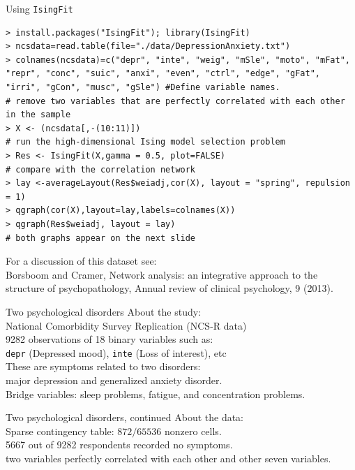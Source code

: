 \documentclass[dvipsnames,aspectratio=169]{beamer} %
\begin{document}
\begin{frame}[fragile,label=DepAnx]{Using \texttt{IsingFit}}
	\begin{lstlisting}
> install.packages("IsingFit"); library(IsingFit)
> ncsdata=read.table(file="./data/DepressionAnxiety.txt") 
> colnames(ncsdata)=c("depr", "inte", "weig", "mSle", "moto", "mFat", "repr", "conc", "suic", "anxi", "even", "ctrl", "edge", "gFat", "irri", "gCon", "musc", "gSle") #Define variable names.
# remove two variables that are perfectly correlated with each other in the sample
> X <- (ncsdata[,-(10:11)])
# run the high-dimensional Ising model selection problem
> Res <- IsingFit(X,gamma = 0.5, plot=FALSE)
# compare with the correlation network
> lay <-averageLayout(Res$weiadj,cor(X), layout = "spring", repulsion = 1)
> qgraph(cor(X),layout=lay,labels=colnames(X))
> qgraph(Res$weiadj, layout = lay)
# both graphs appear on the next slide
\end{lstlisting}
For a discussion of this dataset see:\\[.2cm]
{\footnotesize Borsboom and Cramer, Network analysis: an integrative approach to the\\[-.2cm] structure of psychopathology, Annual review of clinical psychology, 9 (2013). }
\end{frame}


\begin{frame}{Two psychological disorders}
\alert{About the study:}\\[.5cm]
National Comorbidity Survey Replication  (NCS-R data)\\[.4cm]
9282 observations of 18 binary variables such as:\\
\texttt{depr} (Depressed mood), \texttt{inte} (Loss of interest), etc\\[.4cm]
These are symptoms related to two disorders:\\ major depression and generalized anxiety disorder.\\[.4cm]
Bridge variables: sleep problems, fatigue, and concentration problems.

\end{frame}


\begin{frame}{Two psychological disorders, continued}
\alert{About the data:}\\[.5cm]
Sparse contingency table: $872/65536$ nonzero cells. \\[.4cm]
5667 out of 9282 respondents recorded no symptoms.\\[.4cm]
two variables perfectly correlated with each other and other seven variables.\\[.4cm]
\end{frame}
\end{document}
